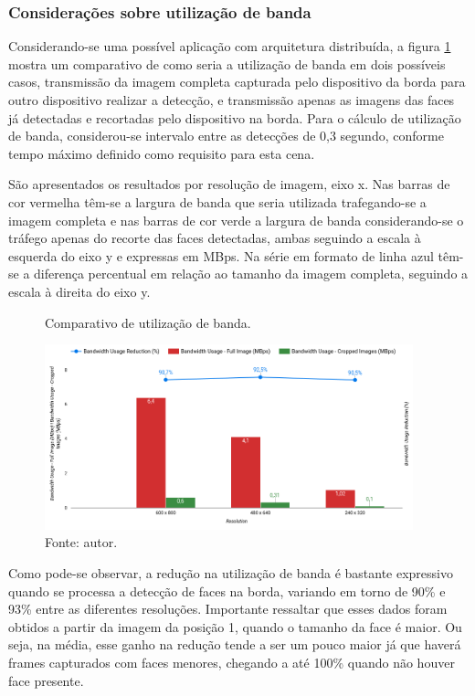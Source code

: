 \subsubsection{Considerações sobre utilização de banda}

Considerando-se uma possível aplicação com arquitetura distribuída, a figura \ref{fig:cena2_comparativo_utilizacao_banda} mostra um comparativo de como seria a utilização de banda em dois possíveis casos, transmissão da imagem completa capturada pelo dispositivo da borda para outro dispositivo realizar a detecção, e transmissão apenas as imagens das
faces já detectadas e recortadas pelo dispositivo na borda. Para o cálculo de utilização de banda, considerou-se intervalo entre as detecções de 0,3 segundo, conforme tempo
máximo definido como requisito para esta cena.

São apresentados os resultados por resolução de imagem, eixo x. Nas barras de cor vermelha têm-se a largura de banda que seria utilizada trafegando-se a imagem completa e nas barras de cor verde a largura de banda considerando-se o tráfego apenas do recorte das faces detectadas, ambas seguindo a escala à esquerda do eixo y e expressas em MBps. Na série em formato de linha azul têm-se a diferença percentual em relação ao tamanho da imagem completa, seguindo a escala à direita do eixo y.

\begin{figure}[h]
    \centering
    \caption[Comparativo de utilização de banda.]{Comparativo de utilização de banda.}
    \includegraphics[width=0.95\textwidth]{Cap4_Experimentos_Realizados/Figures/cena2_comparativo_utilizacao_banda.jpg}
    \caption*{Fonte: autor.}
    \label{fig:cena2_comparativo_utilizacao_banda}
\end{figure}

Como pode-se observar, a redução na utilização de banda é bastante expressivo quando se processa a detecção de faces na borda, variando em torno de 90\% e 93\% entre as diferentes resoluções. Importante ressaltar que esses dados foram obtidos a partir da imagem da posição 1, quando o tamanho da face é maior. Ou seja, na média, esse ganho na redução tende a ser um pouco maior já que haverá frames capturados com faces menores, chegando a até 100\% quando não houver face presente.

